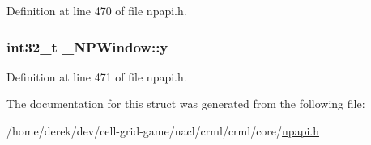 Definition at line 470 of file npapi.h.

\hypertarget{struct___n_p_window_ab5ab51089045b5a16323e36ea26a0c5a}{
\subsubsection[{y}]{\setlength{\rightskip}{0pt plus 5cm}int32\_\-t {\bf \_\-NPWindow::y}}}
\label{struct___n_p_window_ab5ab51089045b5a16323e36ea26a0c5a}


Definition at line 471 of file npapi.h.



The documentation for this struct was generated from the following file:\begin{DoxyCompactItemize}
\item 
/home/derek/dev/cell-\/grid-\/game/nacl/crml/crml/core/\hyperlink{npapi_8h}{npapi.h}\end{DoxyCompactItemize}

